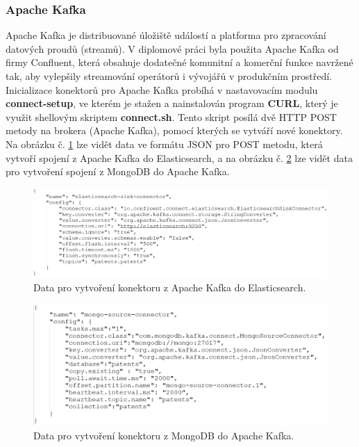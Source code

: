 \subsubsection{Apache Kafka}
Apache Kafka je distribuované úložiště událostí a platforma pro zpracování datových proudů (streamů). V diplomové práci byla použita Apache Kafka od firmy Confluent, která obsahuje dodatečné komunitní a komerční funkce navržené tak, aby vylepšily streamování operátorů i vývojářů v produkčním prostředí.
\newline
\indent Inicializace konektorů pro Apache Kafka probíhá v nastavovacím modulu \textbf{connect-setup}, ve kterém je stažen a nainstalován program \textbf{CURL}, který je využit shellovým skriptem \textbf{connect.sh}. Tento skript posílá dvě \gls{HTTP} POST metody na brokera (Apache Kafka), pomocí kterých se vytváří nové konektory. Na obrázku č. \ref{fig:sink} lze vidět data ve formátu JSON pro POST metodu, která vytvoří spojení z Apache Kafka do Elasticsearch, a na obrázku č. \ref{fig:source} lze vidět data pro vytvoření spojení z MongoDB do Apache Kafka.
\begin{figure}[H]
\centering
\includegraphics[width=15cm]{img/sink}
\caption{Data pro vytvoření konektoru z Apache Kafka do Elasticsearch.}
\label{fig:sink}
\end{figure}
\begin{figure}[H]
\centering
\includegraphics[width=14cm]{img/source}
\caption{Data pro vytvoření konektoru z MongoDB do Apache Kafka.}
\label{fig:source}
\end{figure}